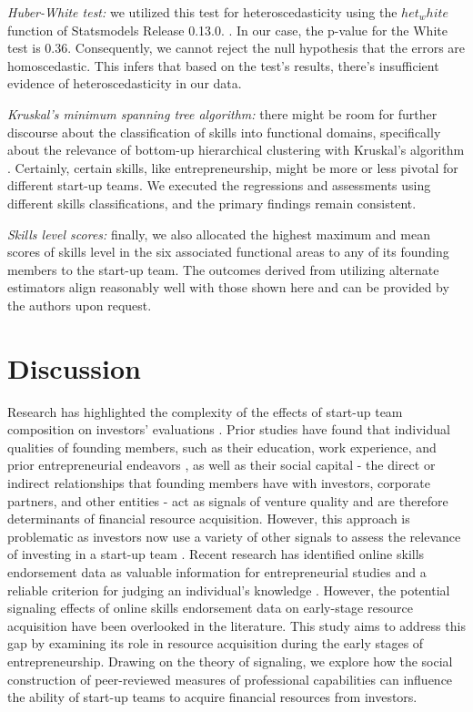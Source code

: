 \documentclass[12pt]{article}
\begin{document}
\textit{Huber-White test:} we utilized this test for heteroscedasticity using the $het_white$ function of Statsmodels Release 0.13.0. \citep{seabold2010statsmodels}. In our case, the p-value for the White test is 0.36. Consequently, we cannot reject the null hypothesis that the errors are homoscedastic. This infers that based on the test's results, there's insufficient evidence of heteroscedasticity in our data.

\textit{Kruskal's minimum spanning tree algorithm:} there might be room for further discourse about the classification of skills into functional domains, specifically about the relevance of bottom-up hierarchical clustering with Kruskal's algorithm \citep{kruskal1956shortest}. Certainly, certain skills, like entrepreneurship, might be more or less pivotal for different start-up teams. We executed the regressions and assessments using different skills classifications, and the primary findings remain consistent.

\textit{Skills level scores:} finally, we also allocated the highest maximum and mean scores of skills level in the six associated functional areas to any of its founding members to the start-up team. The outcomes derived from utilizing alternate estimators align reasonably well with those shown here and can be provided by the authors upon request.

\section{Discussion}

Research has highlighted the complexity of the effects of start-up team composition on investors' evaluations \citep{cooper1994initial, ghassemiautomated}. Prior studies have found that individual qualities of founding members, such as their education, work experience, and prior entrepreneurial endeavors \citep{shane2002network, hsu2007experienced}, as well as their social capital - the direct or indirect relationships that founding members have with investors, corporate partners, and other entities \citep{shane2002network, hsu2007experienced, huang2017resources} - act as signals of venture quality and are therefore determinants of financial resource acquisition. However, this approach is problematic as investors now use a variety of other signals to assess the relevance of investing in a start-up team \citep{banerji2019startup, mollick2014dynamics, courtney2017resolving}. Recent research has identified online skills endorsement data \citep{gasiorowski2022pay, perez2016endorsement, wu2018analysis} as valuable information for entrepreneurial studies and a reliable criterion for judging an individual's knowledge \citep{rapanta2017linkedin, reese2020should, sako2020scaling}. However, the potential signaling effects of online skills endorsement data on early-stage resource acquisition have been overlooked in the literature. This study aims to address this gap by examining its role in resource acquisition during the early stages of entrepreneurship. Drawing on the theory of signaling, we explore how the social construction of peer-reviewed measures of professional capabilities can influence the ability of start-up teams to acquire financial resources from investors.
\end{document}
